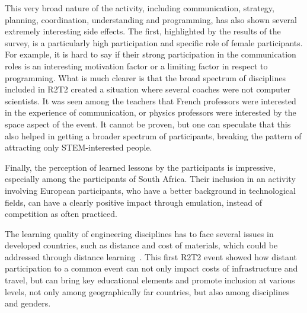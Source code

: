 \documentclass{intech-journal}
\begin{document}

This very broad nature of the activity, including communication, strategy, planning, coordination, understanding and programming, has also shown several extremely interesting side effects.
The first, highlighted by the results of the survey, is a particularly high participation and specific role of female participants.
For example, it is hard to say if their strong participation in the communication roles is an interesting motivation factor or a limiting factor in respect to programming. 
What is much clearer is that the broad spectrum of disciplines included in R2T2 created a situation where several coaches were not computer scientists. 
It was seen among the teachers that French professors were interested in the experience of communication, or physics professors were interested by the space aspect of the event. 
It cannot be proven, but one can speculate that this also helped in getting a broader spectrum of participants, breaking the pattern of attracting only STEM-interested people.

Finally, the perception of learned lessons by the participants is impressive, especially among the participants of South Africa.
Their inclusion in an activity involving European participants, who have a better background in technological fields, can have a clearly positive impact through emulation, instead of competition as often practiced. 

The learning quality of engineering disciplines has to face several issues in developed countries, such as distance and cost of materials, which could be addressed through distance learning~\cite{winthrop2012new}. 
This first R2T2 event showed how distant participation to a common event can not only impact costs of infrastructure and travel, but can bring key educational elements and promote inclusion at various levels, not only among geographically far countries, but also among disciplines and genders.
\small
{}
\end{document}
